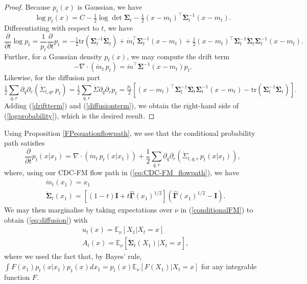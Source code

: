 \documentclass{article} %
\newcommand{\E}{\mathbb{E}}
\newcommand{\I}{\mathbf{I}}
\newcommand{\G}{\widehat{\mathbf{\Gamma}}}
\newcommand{\Si}{\mathbf{\Sigma}}
\begin{document}
\begin{proof}
    Because $p_t(x)$ is Gaussian, we have
    \begin{equation}
        \log p_t(x) = C - \tfrac{1}{2}\log\det \Si_t - \tfrac{1}{2}(x-m_t)^\top\Si_t^{-1}(x-m_t).
    \end{equation}
    Differentiating with respect to $t$, we have
    \begin{equation}\label{logprobability}
        \frac{\partial}{\partial t}\log p_t = \frac{1}{p_t}\frac{\partial}{\partial t}p_t =- \tfrac{1}{2}\mathrm{tr}(\Si_t^{-1}\dot{\Si}_t) + \dot{m}_t^\top\Si^{-1}_t(x-m_t) + \tfrac{1}{2}(x-m_t)^\top\Si_t^{-1}\dot{\Si}_t\Si_t^{-1}(x-m_t).
    \end{equation}
    Further, for a Gaussian density $p_t(x)$, we may compute the drift term
    \begin{equation}\label{driftterm}
        -\nabla\cdot(\dot{m}_t\,p_t)  = \dot{m}^\top\Si^{-1}(x-m_t)p_t.
    \end{equation}
    Likewise, for the diffusion part
    \begin{equation}\label{diffusionterm}
        \tfrac{1}{2}\sum_{q,r}\partial_q\partial_r(\dot{\Sigma}_{t,qr}\,p_t) = \tfrac{1}{2}\sum_{q,r}\dot{\Sigma}\partial_q\partial_rp_t =\tfrac{p_t}{2}\left[(x-m_t)^\top\Si_t^{-1}\dot{\Si_t}\Si_t^{-1}(x-m_t) - \mathrm{tr}(\Si^{-1}_t\dot{\Si}_t)\right].
    \end{equation}
    Adding (\ref{driftterm}) and (\ref{diffusionterm}), we obtain the right-hand side of (\ref{logprobability}), which is the desired result.
\end{proof}

Using Proposition \ref{FPequationflowpath}, we see that the conditional probability path satisfies
%
\begin{equation}\label{conditionalFM}
    \frac{\partial}{\partial t}p_t(x|x_1) = \nabla\cdot(\dot{m}_t\,p_t(x|x_1)) + \frac{1}{2}\sum_{q,r}\partial_q\partial_r(\dot{\Sigma}_{t,q,r}\,p_t(x|x_1)),
\end{equation}
%
where, using our CDC-FM flow path in (\ref{eq:CDC-FM_flowpath}), we have 
\begin{equation}
    \begin{aligned}
        &\dot{m}_t(x_1) = x_1\\
        &\dot{\Si}_t(x_1)=\left[(1-t)\I + t\G(x_1)^{1/2}\right](\G(x_1)^{1/2}-\I).
    \end{aligned}
\end{equation}
%
We may then marginalise by taking expectations over $\nu$ in (\ref{conditionalFM}) to obtain (\ref{eq:diffusion}) with 
%
\begin{equation}
    \begin{aligned}
        &u_t(x) = \E_\nu[X_1|X_t=x]\\
        &A_t(x) = \E_\nu[\dot{\Si}_t(X_1)|X_t=x],
    \end{aligned}
\end{equation}
%
where we used the fact that, by Bayes' rule, $\int F(x_1)p_t(x|x_1)p_1(x)dx_1 = p_t(x)\E_\nu [F(X_1)|X_t=x]$ for any integrable function $F$.
\end{document}
